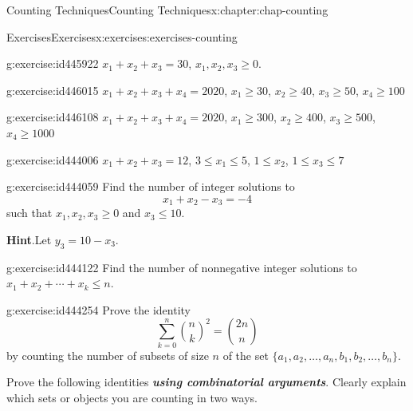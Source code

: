 \documentclass[oneside,10pt,]{book}
\newcommand{\blocktitlefont}{\relax}
\newcommand{\alert}[1]{\textbf{\textit{#1}}}
\numberwithin{equation}{section}
\begin{document}
\begin{chapterptx}{Counting Techniques}{}{Counting Techniques}{}{}{x:chapter:chap-counting}
\begin{exercises-section}{Exercises}{}{Exercises}{}{}{x:exercises:exercises-counting}
\begin{exercisegroup}
\begin{divisionexerciseeg}{19}{}{}{g:exercise:id445922}%
\(x_1 + x_2 + x_3 = 30\), \(x_1, x_2, x_3 \geq 0\).%
\end{divisionexerciseeg}%
\begin{divisionexerciseeg}{20}{}{}{g:exercise:id446015}%
\(x_1 + x_2 + x_3 + x_4 = 2020\), \(x_1 \geq 30\), \(x_2 \geq 40\), \(x_3 \geq 50\), \(x_4 \geq 100\)%
\end{divisionexerciseeg}%
\begin{divisionexerciseeg}{21}{}{}{g:exercise:id446108}%
\(x_1 + x_2 + x_3 + x_4 = 2020\), \(x_1 \geq 300\), \(x_2 \geq 400\), \(x_3 \geq 500\), \(x_4 \geq 1000\)%
\end{divisionexerciseeg}%
\begin{divisionexerciseeg}{22}{}{}{g:exercise:id444006}%
\(x_1 + x_2 + x_3 = 12\), \(3 \leq x_1 \leq 5\), \(1 \leq x_2\), \(1 \leq x_3 \leq 7\)%
\end{divisionexerciseeg}%
\end{exercisegroup}
\par\medskip\noindent
\begin{divisionexercise}{23}{}{}{g:exercise:id444059}%
Find the number of integer solutions to%
\begin{equation*}
x_1 + x_2 - x_3 = -4
\end{equation*}
such that \(x_1, x_2, x_3 \geq 0\) and \(x_3 \leq 10\).%
\par\smallskip%
\noindent\textbf{\blocktitlefont Hint}.\hypertarget{g:hint:id444148}{}\quad{}Let \(y_3 = 10 - x_3\).%
\end{divisionexercise}%
\begin{divisionexercise}{24}{}{}{g:exercise:id444122}%
Find the number of nonnegative integer solutions to \(x_1 + x_2 + \cdots + x_k \leq n\).%
\end{divisionexercise}%
\begin{divisionexercise}{25}{}{}{g:exercise:id444254}%
Prove the identity%
\begin{equation*}
\sum_{k=0}^n \binom{n}{k}^2 = \binom{2n}{n}
\end{equation*}
by counting the number of subsets of size \(n\) of the set \(\{a_1,a_2,\ldots,a_n,b_1,b_2,\ldots,b_n\}\).%
\end{divisionexercise}%
\par\medskip\noindent%
%
Prove the following identities \alert{using combinatorial arguments}. Clearly explain which sets or objects you are counting in two ways.%
\begin{exercisegroup}

\end{exercisegroup}
\end{exercises-section}
\end{chapterptx}
\end{document}
